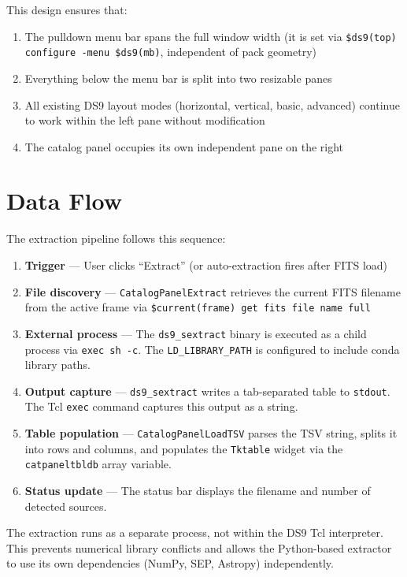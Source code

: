 \documentclass[11pt,fleqn]{book}
\newcommand{\sextract}{\texttt{ds9\_sextract}}
\begin{document}
This design ensures that:
\begin{enumerate}[leftmargin=2em]
  \item The pulldown menu bar spans the full window width (it is set via \texttt{\$ds9(top) configure -menu \$ds9(mb)}, independent of pack geometry)
  \item Everything below the menu bar is split into two resizable panes
  \item All existing DS9 layout modes (horizontal, vertical, basic, advanced) continue to work within the left pane without modification
  \item The catalog panel occupies its own independent pane on the right
\end{enumerate}

\section{Data Flow}

The extraction pipeline follows this sequence:

\begin{enumerate}[leftmargin=2em]
  \item \textbf{Trigger} --- User clicks ``Extract'' (or auto-extraction fires after FITS load)
  \item \textbf{File discovery} --- \texttt{CatalogPanelExtract} retrieves the current FITS filename from the active frame via \texttt{\$current(frame) get fits file name full}
  \item \textbf{External process} --- The \sextract{} binary is executed as a child process via \texttt{exec sh -c}. The \texttt{LD\_LIBRARY\_PATH} is configured to include conda library paths.
  \item \textbf{Output capture} --- \sextract{} writes a tab-separated table to \texttt{stdout}. The Tcl \texttt{exec} command captures this output as a string.
  \item \textbf{Table population} --- \texttt{CatalogPanelLoadTSV} parses the TSV string, splits it into rows and columns, and populates the \texttt{Tktable} widget via the \texttt{catpaneltbldb} array variable.
  \item \textbf{Status update} --- The status bar displays the filename and number of detected sources.
\end{enumerate}

\begin{remark}
The extraction runs as a separate process, not within the DS9 Tcl interpreter. This prevents numerical library conflicts and allows the Python-based extractor to use its own dependencies (NumPy, SEP, Astropy) independently.
\end{remark}
\end{document}
